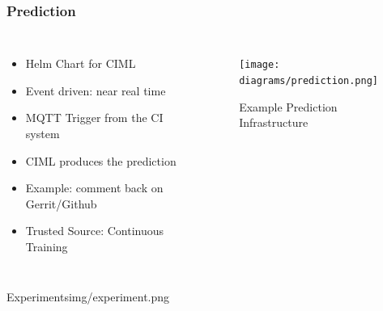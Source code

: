 \documentclass[aspectratio=169,11pt,hyperref={colorlinks=true}]{beamer}
\begin{document}
\begin{frame}
    \frametitle{Prediction}
    \begin{columns}
        \begin{itemize}
            \item{Helm Chart for CIML}
            \item{Event driven: near real time}
            \item{MQTT Trigger from the CI system}
            \item{CIML produces the prediction}
            \item{Example: comment back on Gerrit/Github}
            \item{Trusted Source: Continuous Training}
        \end{itemize}
      \begin{figure}
      \begin{center}
        \texttt{[image: diagrams/prediction.png]}
           \caption{Example Prediction Infrastructure}
      \end{center}
      \end{figure}
    \end{columns}
\end{frame}

\begin{sectionpic}
{Experiments}{img/experiment.png}
\end{sectionpic}
\end{document}
